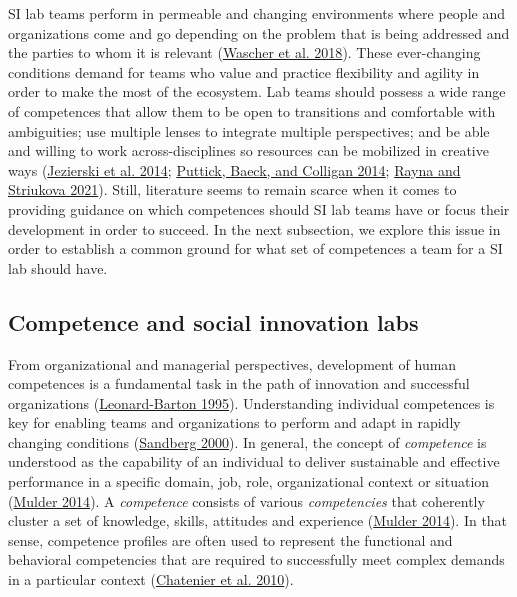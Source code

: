 \documentclass[AMA,STIX1COL,APA,STIX2COL]{WileyNJD-v2}
\begin{document}
SI lab teams perform in permeable and changing environments where people
and organizations come and go depending on the problem that is being
addressed and the parties to whom it is relevant
(\protect\hyperlink{ref-Wascher2018}{Wascher et al. 2018}). These
ever-changing conditions demand for teams who value and practice
flexibility and agility in order to make the most of the ecosystem. Lab
teams should possess a wide range of competences that allow them to be
open to transitions and comfortable with ambiguities; use multiple
lenses to integrate multiple perspectives; and be able and willing to
work across-disciplines so resources can be mobilized in creative ways
(\protect\hyperlink{ref-Jezierski2014}{Jezierski et al. 2014};
\protect\hyperlink{ref-Puttick2014-Teams}{Puttick, Baeck, and Colligan
2014}; \protect\hyperlink{ref-Rayna2021}{Rayna and Striukova 2021}).
Still, literature seems to remain scarce when it comes to providing
guidance on which competences should SI lab teams have or focus their
development in order to succeed. In the next subsection, we explore this
issue in order to establish a common ground for what set of competences
a team for a SI lab should have.

\hypertarget{competence-and-social-innovation-labs}{%
\subsection{Competence and social innovation
labs}\label{competence-and-social-innovation-labs}}

From organizational and managerial perspectives, development of human
competences is a fundamental task in the path of innovation and
successful organizations
(\protect\hyperlink{ref-Leonard1995}{Leonard-Barton 1995}).
Understanding individual competences is key for enabling teams and
organizations to perform and adapt in rapidly changing conditions
(\protect\hyperlink{ref-Sandberg2000}{Sandberg 2000}). In general, the
concept of \emph{competence} is understood as the capability of an
individual to deliver sustainable and effective performance in a
specific domain, job, role, organizational context or situation
(\protect\hyperlink{ref-Mulder2014}{Mulder 2014}). A \emph{competence}
consists of various \emph{competencies} that coherently cluster a set of
knowledge, skills, attitudes and experience
(\protect\hyperlink{ref-Mulder2014}{Mulder 2014}). In that sense,
competence profiles are often used to represent the functional and
behavioral competencies that are required to successfully meet complex
demands in a particular context
(\protect\hyperlink{ref-Chatenier2010}{Chatenier et al. 2010}).
\end{document}
